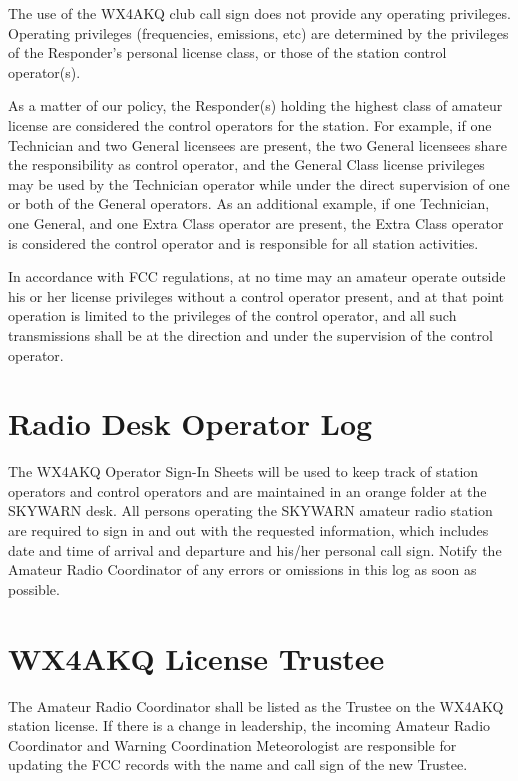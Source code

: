 \documentclass[pdflatex,letterpaper,twoside,12pt]{book}
\begin{document}
The use of the WX4AKQ club call sign does not provide any operating privileges.  Operating privileges (frequencies, emissions, etc) are determined by the privileges of the Responder's personal license class, or those of the station control operator(s). 

As a matter of our policy, the Responder(s) holding the highest class of amateur license are considered the control operators for the station.  For example, if one Technician and two General licensees are present, the two General licensees share the responsibility as control operator, and the General Class license privileges may be used by the Technician operator while under the direct supervision of one or both of the General operators.  As an additional example, if one Technician, one General, and one Extra Class operator are present, the Extra Class operator is considered the control operator and is responsible for all station activities. 

In accordance with FCC regulations, at no time may an amateur operate outside his or her license privileges without a control operator present, and at that point operation is limited to the privileges of the control operator, and all such transmissions shall be at the direction and under the supervision of the control operator.


\section{Radio Desk Operator Log}

The WX4AKQ Operator Sign-In Sheets will be used to keep track of station operators and control operators and are maintained in an orange folder at the SKYWARN desk.  All persons operating the SKYWARN amateur radio station are required to sign in and out with the requested information, which includes date and time of arrival and departure and his/her personal call sign.  Notify the Amateur Radio Coordinator of any errors or omissions in this log as soon as possible.


\section{WX4AKQ License Trustee}
The Amateur Radio Coordinator shall be listed as the Trustee on the WX4AKQ station license.  If there is a change in leadership, the incoming Amateur Radio Coordinator and Warning Coordination Meteorologist are responsible for updating the FCC records with the name and call sign of the new Trustee.
\end{document}
